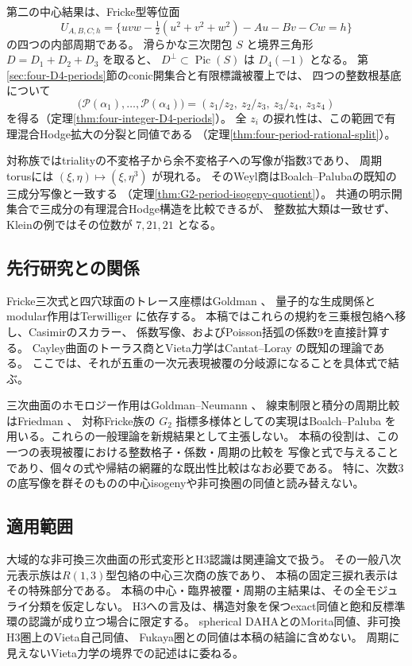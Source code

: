 \documentclass[11pt,a4paper]{ltjsarticle}
\begin{document}
第二の中心結果は、Fricke型等位面
\[
 U_{A,B,C;h}=\{uvw-\tfrac12(u^2+v^2+w^2)-Au-Bv-Cw=h\}
\]
の四つの内部周期である。
滑らかな三次閉包 $S$ と境界三角形 $D=D_1+D_2+D_3$ を取ると、
$D^\perp\subset\operatorname{Pic}(S)$ は $D_4(-1)$ となる。
第\ref{sec:four-D4-periods}節のconic開集合と有限標識被覆上では、
四つの整数根基底について
\[
 \bigl(\mathcal P(\alpha_1),\ldots,\mathcal P(\alpha_4)\bigr)
 =\left(z_1/z_2,\ z_2/z_3,\ z_3/z_4,\ z_3z_4\right)
\]
を得る（定理\ref{thm:four-integer-D4-periods}）。
全 $z_i$ の捩れ性は、この範囲で有理混合Hodge拡大の分裂と同値である
（定理\ref{thm:four-period-rational-split}）。

対称族ではtrialityの不変格子から余不変格子への写像が指数3であり、
周期torusには $(\xi,\eta)\mapsto(\xi,\eta^3)$ が現れる。
そのWeyl商はBoalch--Palubaの既知の三成分写像と一致する
（定理\ref{thm:G2-period-isogeny-quotient}）。
共通の明示開集合で三成分の有理混合Hodge構造を比較できるが、
整数拡大類は一致せず、Kleinの例ではその位数が $7,21,21$ となる。

\subsection{先行研究との関係}
Fricke三次式と四穴球面のトレース座標はGoldman \cite{GoldmanTrace}、
量子的な生成関係とmodular作用はTerwilliger \cite{TerwilligerDAHA} に依存する。
本稿ではこれらの規約を三乗根包絡へ移し、Casimirのスカラー、
係数写像、およびPoisson括弧の係数9を直接計算する。
Cayley曲面のトーラス商とVieta力学はCantat--Loray \cite{CantatLorayCayley} の既知の理論である。
ここでは、それが五重の一次元表現被覆の分岐源になることを具体式で結ぶ。

三次曲面のホモロジー作用はGoldman--Neumann \cite{BoundaryGoldmanNeumann}、
線束制限と積分の周期比較はFriedman \cite{FrickeFriedman}、
対称Fricke族の $G_2$ 指標多様体としての実現はBoalch--Paluba \cite{FrickeBoalchPaluba}
を用いる。これらの一般理論を新規結果として主張しない。
本稿の役割は、この一つの表現被覆における整数格子・係数・周期の比較を
写像と式で与えることであり、個々の式や帰結の網羅的な既出性比較はなお必要である。
特に、次数3の底写像を群そのものの中心isogenyや非可換圏の同値と読み替えない。

\subsection{適用範囲}
大域的な非可換三次曲面の形式変形とH3認識は関連論文\cite{CompanionE6}で扱う。
その一般八次元表示族は$R(1,3)$型包絡の中心三次商の族であり、
本稿の固定三捩れ表示はその特殊部分である。
本稿の中心・臨界被覆・周期の主結果は、その全モジュライ分類を仮定しない。
H3への言及は、構造対象を保つexact同値と飽和反標準環の認識が成り立つ場合に限定する。
spherical DAHAとのMorita同値、非可換H3圏上のVieta自己同値、
Fukaya圏との同値は本稿の結論に含めない。
周期に見えないVieta力学の境界での記述は\cite{CompanionBoundary}に委ねる。
\end{document}
